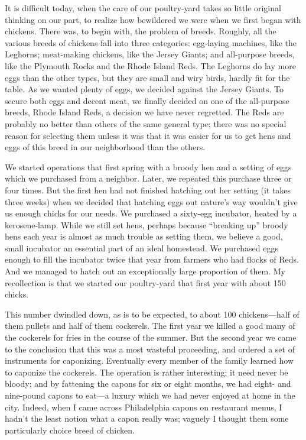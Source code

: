 \documentclass{book}
\begin{document}
It is difficult today, when the care of our poultry-yard takes so little original thinking on our part, to realize how bewildered we were when we first began with chickens. There was, to begin with, the problem of breeds. Roughly, all the various breeds of chickens fall into three categories: egg-laying machines, like the Leghorns; meat-making chickens, like the Jersey Giants; and all-purpose breeds, like the Plymouth Rocks and the Rhode Island Reds. The Leghorns do lay more eggs than the other types, but they are small and wiry birds, hardly fit for the table. As we wanted plenty of eggs, we decided against the Jersey Giants. To secure both eggs and decent meat, we finally decided on one of the all-purpose breeds, Rhode Island Reds, a decision we have never regretted. The Reds are probably no better than others of the same general type; there was no special reason for selecting them unless it was that it was easier for us to get hens and eggs of this breed in our neighborhood than the others.

We started operations that first spring with a broody hen and a setting of eggs which we purchased from a neighbor. Later, we repeated this purchase three or four times. But the first hen had not finished hatching out her setting (it takes three weeks) when we decided that hatching eggs out nature’s way wouldn’t give us enough chicks for our needs. We purchased a sixty-egg incubator, heated by a kerosene-lamp. While we still set hens, perhaps because “breaking up” broody hens each year is almost as much trouble as setting them, we believe a good, small incubator an essential part of an ideal homestead. We purchased eggs enough to fill the incubator twice that year from farmers who had flocks of Reds. And we managed to hatch out an exceptionally large proportion of them. My recollection is that we started our poultry-yard that first year with about 150 chicks.

This number dwindled down, as is to be expected, to about 100 chickens—half of them pullets and half of them cockerels. The first year we killed a good many of the cockerels for fries in the course of the summer. But the second year we came to the conclusion that this was a most wasteful proceeding, and ordered a set of instruments for caponizing. Eventually every member of the family learned how to caponize the cockerels. The operation is rather interesting; it need never be bloody; and by fattening the capons for six or eight months, we had eight- and nine-pound capons to eat—a luxury which we had never enjoyed at home in the city. Indeed, when I came across Philadelphia capons on restaurant menus, I hadn’t the least notion what a capon really was; vaguely I thought them some particularly choice breed of chicken.
\end{document}
